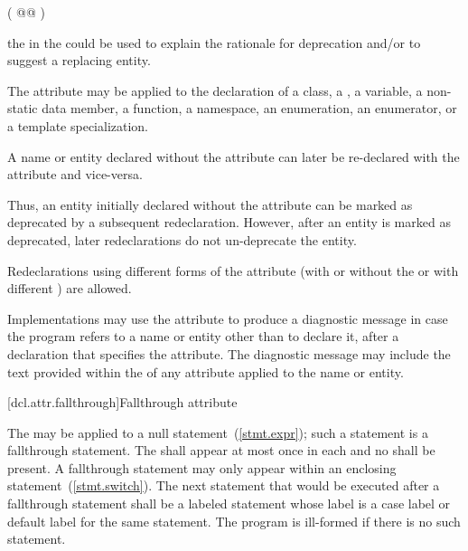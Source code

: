 \begin{codeblock}
( @@ )
\end{codeblock}
\begin{note} the  in the 
could be used to explain the rationale for deprecation and/or to suggest a replacing entity.
\end{note}

\pnum
The attribute may be applied to the declaration of
a class,
a ,
a variable,
a non-static data member,
a function,
a namespace,
an enumeration,
an enumerator, or
a template specialization.

\pnum
A name or entity declared without the  attribute can later be re-declared
with the attribute and vice-versa. \begin{note} Thus, an entity initially declared without the
attribute can be marked as deprecated by a subsequent redeclaration. However, after an entity
is marked as deprecated, later redeclarations do not un-deprecate the entity. \end{note} 
Redeclarations using different forms of the attribute (with or without the
 or with different
) are allowed.

\pnum
\begin{note} Implementations may use the  attribute to produce a diagnostic
message in case the program refers to a name or entity other than to declare it, after a
declaration that specifies the attribute. The diagnostic message may include the text provided
within the  of any  attribute applied
to the name or entity. \end{note}

[dcl.attr.fallthrough]{Fallthrough attribute}

\pnum
The  
may be applied to a null statement~(\ref{stmt.expr});
such a statement is a fallthrough statement.
The  
shall appear at most once in each  and
no  shall be present.
A fallthrough statement may only appear within
an enclosing  statement~(\ref{stmt.switch}).
The next statement that would be executed after a fallthrough statement
shall be a labeled statement whose label is a case label or
default label for the same  statement.
The program is ill-formed if there is no such statement.

